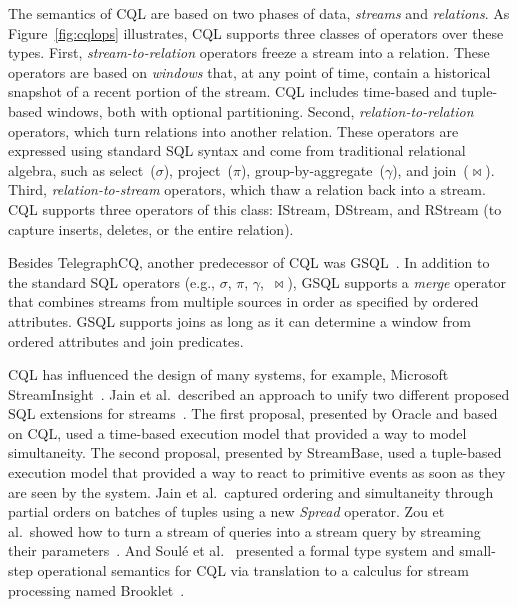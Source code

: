 The semantics of CQL are
based on two phases of data, \emph{streams} and \emph{relations}.
As Figure~\ref{fig:cqlops} illustrates, CQL
supports three classes of operators over these types. First,
\emph{stream-to-relation} operators freeze a stream into a relation.
These operators are based on
\emph{windows} that, at any point of time, contain a
historical snapshot of a recent portion of the stream. CQL includes
time-based and tuple-based windows, both with optional
partitioning. Second, \emph{relation-to-relation} operators, which
turn relations into another relation. These operators are expressed
using standard SQL syntax and come from traditional relational
algebra, such as select~($\sigma$), project~($\pi$),
group-by-aggregate~($\gamma$), and join~($\bowtie$).
Third, \emph{rela\-tion-to-stream} operators, which thaw a relation
back into a stream. CQL supports three operators of this class:
IStream, DStream, and RStream (to capture inserts, deletes, or the entire
relation).

Besides TelegraphCQ, another predecessor of CQL was
GSQL~\cite{cranor_et_al_2003}.  In addition to the standard SQL
operators (e.g., $\sigma$, $\pi$, $\gamma$,~$\bowtie$), GSQL supports
a \emph{merge} operator that combines streams from multiple sources in
order as specified by ordered attributes.  GSQL supports joins as long
as it can determine a window from ordered attributes and join predicates.

CQL has influenced the design of many systems, for example, Microsoft
StreamInsight~\cite{ali_et_al_2009}.  Jain et al.\ described an
approach to unify two different proposed SQL extensions for
streams~\cite{jain_et_al_2008}. The first proposal, presented by
Oracle and based on CQL, used a time-based execution model that
provided a way to model simultaneity. The second proposal, presented
by StreamBase, used a tuple-based execution model that provided a way
to react to primitive events as soon as they are seen by the system.
Jain et al.\ captured ordering and simultaneity through partial orders
on batches of tuples using a new \emph{Spread} operator.  Zou et
al.\ showed how to turn a stream of queries into a stream query by
streaming their parameters~\cite{zou_et_al_2010}.  And Soul\'{e} et
al.~\cite{soule_et_al_2016} presented a formal type system and
small-step operational semantics for CQL via translation to a calculus
for stream processing named Brooklet~\cite{soule_et_al_2010}.
